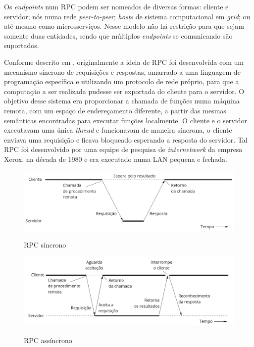 Os \textit{endpoints} num RPC podem ser nomeados de diversas formas: cliente e servidor; nós numa rede \textit{peer-to-peer}; \textit{hosts} de sistema computacional em \textit{grid}; ou até mesmo como microsserviços. Nesse modelo não há restrição para que sejam somente duas entidades, sendo que múltiplos \textit{endpoints} se comunicando são suportados\cite{bergstrom2007anycast}.

Conforme descrito em \cite{birrell1984implementing}, originalmente a ideia de RPC foi desenvolvida com um mecanismo síncrono de requisições e respostas, amarrado a uma linguagem de programação específica e utilizando um protocolo de rede próprio, para que a computação a ser realizada pudesse ser exportada do cliente para o servidor. O objetivo desse sistema era proporcionar a chamada de funções numa máquina remota, com um espaço de endereçamento diferente, a partir das mesmas semânticas encontradas para executar funções localmente. O cliente e o servidor executavam uma única \textit{thread} e funcionavam de maneira síncrona, o cliente enviava uma requisição e ficava bloqueado esperando a resposta do servidor. Tal RPC foi desenvolvido por uma equipe de pesquisa de \textit{internetwork} da empresa Xerox, na década de 1980 e era executado numa LAN pequena e fechada.

\begin{figure}[ht]
    \centering
    \caption{RPC síncrono}
    \includegraphics[width=\textwidth]{figuras/diagramas/cap2/rpc_sync.png} 
    \label{fig:rpc_sync}
\end{figure}

\begin{figure}[ht]
    \centering
    \caption{RPC assíncrono}
    \includegraphics[width=\textwidth]{figuras/diagramas/cap2/rpc_async.png} 
    \label{fig:rpc_async}
\end{figure}

